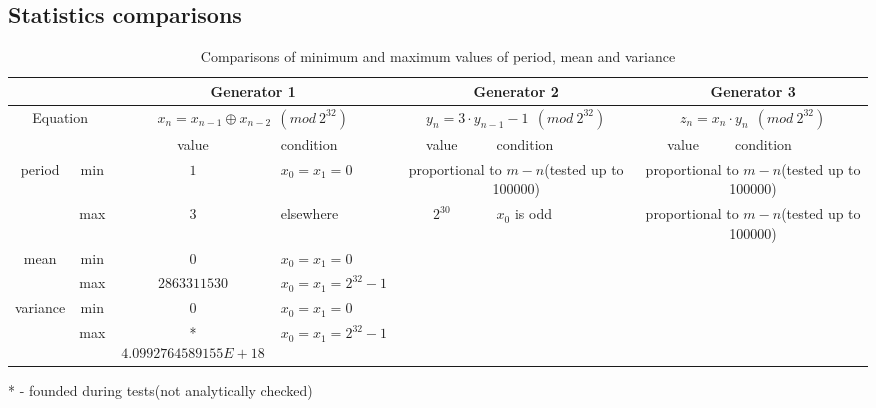 \documentclass[a4paper,10pt]{article}
\newcommand{\xmark}{\ding{55}}%
\begin{document}
\begin{landscape}
\appendix
\section{Statistics comparisons}
\begin{table}[ht!]
\centering
\caption{Comparisons of minimum and maximum values of period, mean and variance}
\label{tab:comparisons}
  \begin{tabular}{cc|c|l|c|l|c|l|}
  \cline{3-8}
						  &     & \multicolumn{2}{|c|}{Generator 1} & \multicolumn{2}{|c|}{Generator 2} & \multicolumn{2}{|c|}{Generator 3} \\ \hline
  \multicolumn{2}{|c|}{Equation}                        & \multicolumn{2}{|c|}{$x_n = x_{n-1} \oplus x_{n-2}\ \ (mod\ 2^{32})$} & \multicolumn{2}{|c|}{$y_n = 3 \cdot y_{n-1} - 1\ \ (mod\ 2^{32})$} & \multicolumn{2}{|c|}{$z_n = x_n \cdot y_n\ \ (mod\ 2^{32})$} \\ \hline
  \multicolumn{2}{|c|}{}                                & value & condition & value & condition & value & condition \\ \hline \hline
  \multicolumn{1}{|c|}{\multirow{2}{*}{period}}   & min & $1$ & $x_0=x_1=0$                               &  \multicolumn{2}{|c|}{proportional to $m-n$(tested up to 100000)} & \multicolumn{2}{|c|}{proportional to $m-n$(tested up to 100000)}  \\ \cline{2-8} 
  \multicolumn{1}{|c|}{}                          & max & $3$ & elsewhere                                 & $2^{30}$ & $x_0$ is odd      & \multicolumn{2}{|c|}{proportional to $m-n$(tested up to 100000)}  \\ \hline
  \multicolumn{1}{|c|}{\multirow{2}{*}{mean}}     & min & $0$ & $x_0=x_1=0$                               & \multicolumn{2}{|c|}{\xmark} & \multicolumn{2}{|c|}{\xmark} \\ \cline{2-8} 
  \multicolumn{1}{|c|}{}                          & max & $2863311530$ & $x_0=x_1=2^{32}-1$               & \multicolumn{2}{|c|}{\xmark} & \multicolumn{2}{|c|}{\xmark} \\ \hline
  \multicolumn{1}{|c|}{\multirow{2}{*}{variance}} & min & $0$ & $x_0=x_1=0$                               & \multicolumn{2}{|c|}{\xmark} & \multicolumn{2}{|c|}{\xmark} \\ \cline{2-8} 
  \multicolumn{1}{|c|}{}                          & max & *$4.0992764589155E+18$ & $x_0=x_1=2^{32}-1$     & \multicolumn{2}{|c|}{\xmark} & \multicolumn{2}{|c|}{\xmark} \\ \hline
  \end{tabular}
\end{table}
* - founded during tests(not analytically checked)

\end{landscape}
\end{document}
